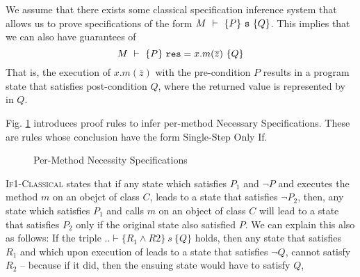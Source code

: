 We assume that there exists some classical specification
inference system  that allows us to prove 
specifications of the form  $M\ \vdash\ \{P\}\ {\texttt{s}}\ \{Q\}$. 
This implies that we can also have guarantees of  
$$M\ \vdash\ \{P\}\ {\texttt{res}} = x.m(\overline{z})\ \{Q\}$$
That is,   %
 the execution of $x.m(\overline{z})$ 
with the pre-condition $P$ results in a program state that 
satisfies post-condition $Q$, where the returned value is represented
by  in $Q$.

Fig. \ref{f:classical->singlestep} introduces  %
proof rules to infer per-method Necessary Specifications.
These are rules whose conclusion have the  form Single-Step Only If. 

\begin{figure}[t]
\footnotesize
{}
\caption{Per-Method Necessity Specifications}
\label{f:classical->singlestep}
\end{figure}

 

 \textsc{If1-Classical} states that  
if any state which satisfies $P_1$ and $\neg P$ and executes  the method $m$ on an obejct of class $C$, leads to a state that satisfies $\neg P_2$, then, any state which satisfies $P_1$ and calls $m$ on an object of class $C$ will lead to a state that satisfies $P_2$ only if the original state also satisfied $P$.
We can explain this also as follows: If the triple $.. \vdash \{R_1 \wedge R2\}\ s\ \{Q\}$ holds, then any state that satisfies $R_1$ and which upon execution of  leads to a state that satisfies $\neg Q$, cannot satisfy $R_2$ -- because  if it did, then the ensuing state would have to satisfy $Q$,
 


